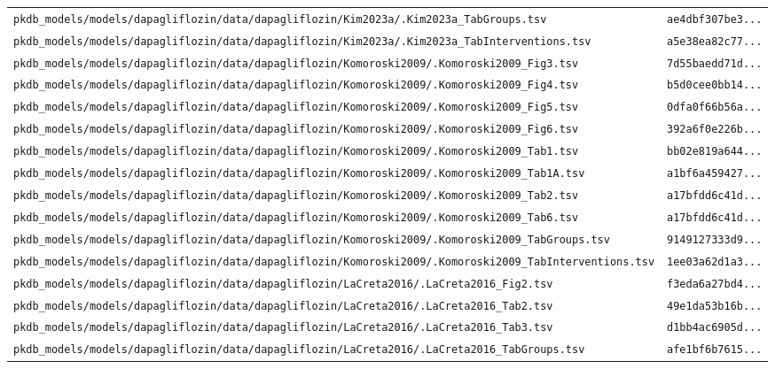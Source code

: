 \documentclass{article}
\begin{document}
\begin{longtable}{ll}
\texttt{pkdb\_models/models/dapagliflozin/data/dapagliflozin/Kim2023a/.Kim2023a\_TabGroups.tsv} & \texttt{ae4dbf307be3...} \\
\texttt{pkdb\_models/models/dapagliflozin/data/dapagliflozin/Kim2023a/.Kim2023a\_TabInterventions.tsv} & \texttt{a5e38ea82c77...} \\
\texttt{pkdb\_models/models/dapagliflozin/data/dapagliflozin/Komoroski2009/.Komoroski2009\_Fig3.tsv} & \texttt{7d55baedd71d...} \\
\texttt{pkdb\_models/models/dapagliflozin/data/dapagliflozin/Komoroski2009/.Komoroski2009\_Fig4.tsv} & \texttt{b5d0cee0bb14...} \\
\texttt{pkdb\_models/models/dapagliflozin/data/dapagliflozin/Komoroski2009/.Komoroski2009\_Fig5.tsv} & \texttt{0dfa0f66b56a...} \\
\texttt{pkdb\_models/models/dapagliflozin/data/dapagliflozin/Komoroski2009/.Komoroski2009\_Fig6.tsv} & \texttt{392a6f0e226b...} \\
\texttt{pkdb\_models/models/dapagliflozin/data/dapagliflozin/Komoroski2009/.Komoroski2009\_Tab1.tsv} & \texttt{bb02e819a644...} \\
\texttt{pkdb\_models/models/dapagliflozin/data/dapagliflozin/Komoroski2009/.Komoroski2009\_Tab1A.tsv} & \texttt{a1bf6a459427...} \\
\texttt{pkdb\_models/models/dapagliflozin/data/dapagliflozin/Komoroski2009/.Komoroski2009\_Tab2.tsv} & \texttt{a17bfdd6c41d...} \\
\texttt{pkdb\_models/models/dapagliflozin/data/dapagliflozin/Komoroski2009/.Komoroski2009\_Tab6.tsv} & \texttt{a17bfdd6c41d...} \\
\texttt{pkdb\_models/models/dapagliflozin/data/dapagliflozin/Komoroski2009/.Komoroski2009\_TabGroups.tsv} & \texttt{9149127333d9...} \\
\texttt{pkdb\_models/models/dapagliflozin/data/dapagliflozin/Komoroski2009/.Komoroski2009\_TabInterventions.tsv} & \texttt{1ee03a62d1a3...} \\
\texttt{pkdb\_models/models/dapagliflozin/data/dapagliflozin/LaCreta2016/.LaCreta2016\_Fig2.tsv} & \texttt{f3eda6a27bd4...} \\
\texttt{pkdb\_models/models/dapagliflozin/data/dapagliflozin/LaCreta2016/.LaCreta2016\_Tab2.tsv} & \texttt{49e1da53b16b...} \\
\texttt{pkdb\_models/models/dapagliflozin/data/dapagliflozin/LaCreta2016/.LaCreta2016\_Tab3.tsv} & \texttt{d1bb4ac6905d...} \\
\texttt{pkdb\_models/models/dapagliflozin/data/dapagliflozin/LaCreta2016/.LaCreta2016\_TabGroups.tsv} & \texttt{afe1bf6b7615...} \\

\end{longtable}
\end{document}
